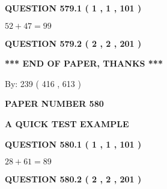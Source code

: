 \documentclass[12pt]{article}
\begin{document}
{\textbf{\Large{QUESTION
579.1 
 ( 1 , 1 , 101 )
}}}
  
  
 
 

$ %
52 +  %
47=   %
99$
 
 
  
\vspace{0.2in}
  
{\textbf{\Large{QUESTION
579.2 
 ( 2 , 2 , 201 )
}}}
  
  
   
   
 \vspace{0.2in}
 
   
   
   
   
\vspace{1.0in} 
{\textbf{\large{ *** END OF PAPER, THANKS *** }}} 
   
   
\hspace{1.0in} By: 
 239 ( 416 ,  613 )
   
   
   
   
\newpage 
\setcounter{page}{ 
   580001 } 
   
   
   
   
 {\textbf{ \Large{ PAPER NUMBER  580  }}}
   
   
\vspace{0.2in}
   
   
   
   
   
   
 \vspace{0.2in}
{\LARGE {\textbf{ A QUICK TEST EXAMPLE}}}
   
   
  
\vspace{0.2in}
  
{\textbf{\Large{QUESTION
580.1 
 ( 1 , 1 , 101 )
}}}
  
  
 
 

$ %
28 +  %
61=   %
89$
 
 
  
\vspace{0.2in}
  
{\textbf{\Large{QUESTION
580.2 
 ( 2 , 2 , 201 )
}}}
  
  
   
   
 \vspace{0.2in}
 
   
   
\end{document}

